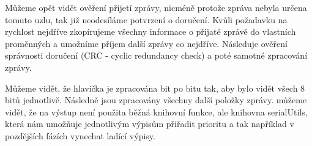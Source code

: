 \documentclass[12pt,titlepage]{article}
\begin{document}
Můžeme opět vidět ověření přijetí zprávy, nicméně protože zpráva nebyla určena tomuto uzlu, tak již neodesíláme potvrzení o doručení. Kvůli požadavku na rychlost nejdříve zkopírujeme všechny informace o přijaté zprávě do vlastních proměnných a umožníme příjem další zprávy co nejdříve. Následuje ověření správnosti doručení (CRC - cyclic redundancy check) a poté samotné zpracování zprávy. 

Můžeme vidět, že hlavička je zpracována bit po bitu tak, aby bylo vidět všech 8 bitů jednotlivě. Následně jsou zpracovány všechny další položky zprávy. můžeme vidět, že na výstup není použita běžná knihovní funkce, ale knihovna serialUtils, která nám umožňuje jednotlivým výpisům přiřadit prioritu a tak například v pozdějších fázích vynechat ladící výpisy. 
	 
\end{document}

